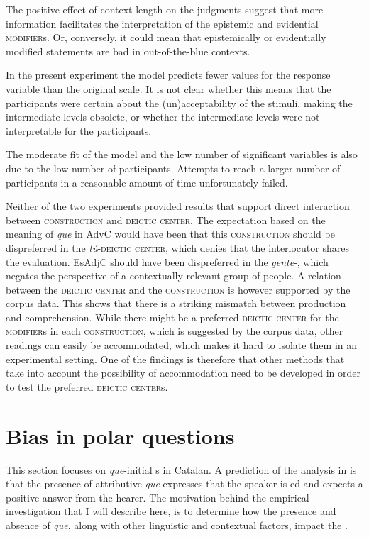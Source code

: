 The positive effect of context length on the judgments suggest that more information facilitates the interpretation of the epistemic and evidential \textsc{modifier}s. Or, conversely, it could mean that epistemically or evidentially modified statements are bad in out-of-the-blue contexts. 

In the present experiment the model  predicts fewer values for the response variable than the original scale. It is not clear whether this means that the par\-ti\-ci\-pants were  certain about the (un)acceptability  of the stimuli, making the intermediate levels obsolete, or whether the intermediate levels were not interpretable for the participants.

The  moderate fit of the model and the low number of significant variables is  also due to  the low number of participants. Attempts to reach a larger number of participants in a reasonable amount of time unfortunately failed.

Neither of the two experiments provided results that support direct interaction between \textsc{construction} and \textsc{deictic center}. The expectation based on the meaning of \textit{que} in AdvC would have been that this \textsc{construction} should be dispreferred in the \textit{tú}-\textsc{deictic center}, which denies that the interlocutor shares the evaluation. EsAdjC should have been dispreferred in the \textit{\textit{gente}}-\textsc{}, which negates the perspective of a contextually-relevant group of people. A relation between the \textsc{deictic center} and the \textsc{construction} is however  supported by the corpus data. This shows that there is a striking mismatch between production and comprehension. While there might be a preferred \textsc{deictic center} for the \textsc{modifier}s in each \textsc{construction}, which is suggested by the corpus data, other readings can easily be accommodated, which makes it hard to isolate them in an experimental setting.   One of the findings is therefore that other methods that take into account the possibility of accommodation need to be developed in order to test the preferred \textsc{deictic center}s.


\section{Bias in polar questions}\label{sec:expbias}
This section focuses on  \emph{que}-initial s in Catalan. A prediction of the analysis in  is that the presence of attributive \emph{que} expresses  that the speaker is ed and expects a positive answer from the hearer. The motivation behind the empirical investigation that I will describe here, is to determine how the presence and absence of \emph{que}, along with other linguistic and contextual factors, impact the .

